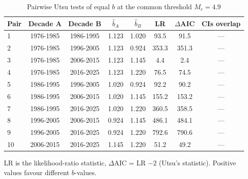 \begin{table}[t]
\centering
\begin{threeparttable}
\caption{Pairwise Utsu tests of equal $b$ at the common threshold $M_c=4.9$}
\label{tab:tests_common}
\begin{tabular}{lccccccc}
\toprule
Pair & Decade A & Decade B & $\hat b_A$ & $\hat b_B$ & LR & $\Delta$AIC & CIs overlap \\
\midrule
1 & 1976-1985 & 1986-1995 & 1.123 & 1.020 & 93.5 & 91.5 & --- \\
2 & 1976-1985 & 1996-2005 & 1.123 & 0.924 & 353.3 & 351.3 & --- \\
3 & 1976-1985 & 2006-2015 & 1.123 & 1.145 & 4.4 & 2.4 & --- \\
4 & 1976-1985 & 2016-2025 & 1.123 & 1.220 & 76.5 & 74.5 & --- \\
5 & 1986-1995 & 1996-2005 & 1.020 & 0.924 & 92.2 & 90.2 & --- \\
6 & 1986-1995 & 2006-2015 & 1.020 & 1.145 & 155.2 & 153.2 & --- \\
7 & 1986-1995 & 2016-2025 & 1.020 & 1.220 & 360.5 & 358.5 & --- \\
8 & 1996-2005 & 2006-2015 & 0.924 & 1.145 & 486.1 & 484.1 & --- \\
9 & 1996-2005 & 2016-2025 & 0.924 & 1.220 & 792.6 & 790.6 & --- \\
10 & 2006-2015 & 2016-2025 & 1.145 & 1.220 & 51.2 & 49.2 & --- \\
\bottomrule
\end{tabular}
\begin{tablenotes}[flushleft]
\footnotesize
\item LR is the likelihood-ratio statistic, $\Delta$AIC = LR $-2$ (Utsu's statistic). Positive values favour different $b$-values.
\end{tablenotes}
\end{threeparttable}
\end{table}
